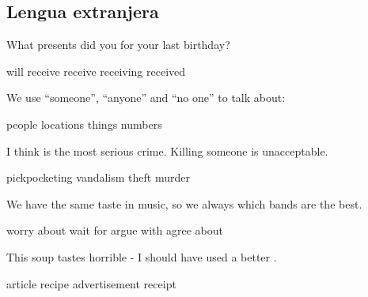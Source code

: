 \documentclass[12pt]{evaluasep}
\begin{document}
\begin{questions}
\begin{choices}
    \end{choices}
    

    \subsection{Lengua extranjera}
    \question What presents did you \underline{\hspace{2cm}} for your last birthday?
    
    \begin{choices}
        \choice will receive
        \CorrectChoice receive
        \choice receiving
        \choice received
    
    \end{choices}
    

    \question We use ``someone'', ``anyone'' and ``no one'' to talk about:
    
    \begin{choices}
        \CorrectChoice people
        \choice locations
        \choice things
        \choice numbers
    
    \end{choices}
    
    \newpage

    \question I think \underline{\hspace{2cm}} is the most serious crime. Killing someone is unacceptable.
    
    \begin{choices}
        \choice pickpocketing
        \choice vandalism
        \choice theft
        \CorrectChoice murder
    
    \end{choices}
    

    \question We have the same taste in music, so we always \underline{\hspace{2cm}} which bands are the best.
    
    \begin{choices}
        \choice worry about
        \choice wait for
        \choice argue with
        \CorrectChoice agree about
    
    \end{choices}
    
    
    \question This soup tastes horrible - I should have used a better \underline{\hspace{2cm}}.
    
    \begin{choices}
        \choice article
        \CorrectChoice recipe
        \choice advertisement
        \choice receipt
    

\end{choices}
\end{questions}
\end{document}
